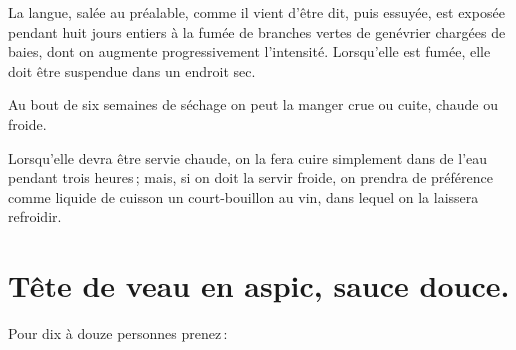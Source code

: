 
La langue, salée au préalable, comme il vient d'être dit, puis essuyée, est
exposée pendant huit jours entiers à la fumée de branches vertes de genévrier
chargées de baies, dont on augmente progressivement l'intensité. Lorsqu'elle
est fumée, elle doit être suspendue dans un endroit sec.

Au bout de six semaines de séchage on peut la manger crue ou cuite, chaude
ou froide.

Lorsqu'elle devra être servie chaude, on la fera cuire simplement dans de l'eau
pendant trois heures ; mais, si on doit la servir froide, on prendra de
préférence comme liquide de cuisson un court-bouillon au vin, dans lequel on la
laissera refroidir.

\section*{\centering Tête de veau en aspic, sauce douce.}
\label{pg0415} \hypertarget{p0415}{}
\label{pg0416} \hypertarget{p0416}{}

Pour dix à douze personnes prenez :

